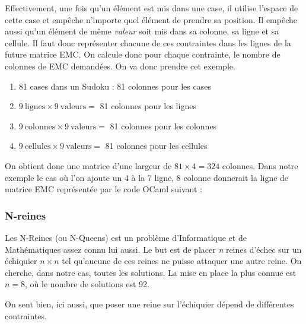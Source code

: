 \documentclass[a4paper]{article}
\begin{document}
Effectivement, une fois qu'un élément est mis dans une case, il utilise l'espace
de cette case et empêche n'importe quel élément de prendre sa position. 
Il empêche aussi qu'un élément de même \emph{valeur} soit mis dans 
sa colonne, sa ligne et sa cellule. 
Il faut donc représenter chacune de ces contraintes dans les lignes de 
la future matrice EMC. On calcule donc pour chaque contrainte, le nombre de
colonnes de EMC demandées. On va donc prendre cet exemple.


\begin{enumerate}
\item 81 cases dans un Sudoku
: 81 colonnes pour les cases
\item $ 9~\textrm{lignes} \times 9~\textrm{valeurs} = $ 
81 colonnes pour les lignes
\item $ 9~\textrm{colonnes} \times 9~\textrm{valeurs} = $ 
81 colonnes pour les colonnes
\item $ 9~\textrm{cellules} \times 9~\textrm{valeurs} = $
81 colonnes pour les cellules
\end{enumerate}

On obtient donc une matrice d'une largeur de $ 81 \times 4 = 324 $ colonnes. 
Dans notre exemple le cas où l'on ajoute un 4 à la 7 ligne, 8 
colonne donnerait la ligne de matrice EMC représentée par le code OCaml 
suivant : 




\subsubsection{N-reines}

Les N-Reines (ou N-Queens) est un problème d'Informatique et de Mathématiques 
assez connu lui aussi. 
Le but est de placer \emph{n} reines d'échec sur un échiquier $ n \times n $ tel
qu'aucune de ces reines ne puisse attaquer une autre reine. On cherche,
dans notre cas, toutes les solutions.
La mise en place la plus connue est $ n = 8 $, où le nombre de solutions est 
92. 

On sent bien, ici aussi, que poser une reine sur l'échiquier dépend de
différentes contraintes. 
\end{document}
